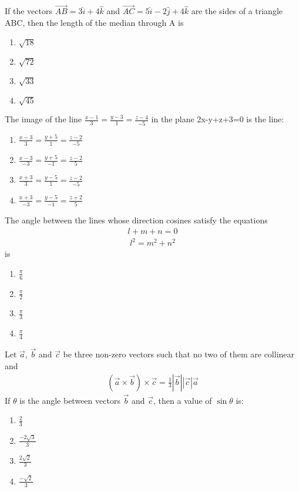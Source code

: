 \item If the vectors $\overrightarrow{AB}=3\hat{i}+4\hat{k}$ and $\overrightarrow{AC}=5\hat{i}-2\hat{j}+4\hat{k}$ are the sides of a triangle ABC, then the length of the median through A is
\begin{enumerate}
\item $\sqrt{18}$
\item $\sqrt{72}$
\item $\sqrt{33}$
\item $\sqrt{45}$
\end{enumerate}

\item The image of the line $\frac{x-1}{3}=\frac{y-3}{1}=\frac{z-4}{-5}$ in the plane 2x-y+z+3=0 is the line:
\begin{enumerate}
\item $\frac{x-3}{3}=\frac{y+5}{1}=\frac{z-2}{-5}$
\item $\frac{x-3}{-3}=\frac{y+5}{-1}=\frac{z-2}{5}$
\item $\frac{x+3}{3}=\frac{y-5}{1}=\frac{z-2}{-5}$
\item $\frac{x+3}{-3}=\frac{y-5}{-1}=\frac{z+2}{5}$ 
\end{enumerate}

\item The angle between the lines whose direction cosines satisfy the equations
\begin{align*}
l+m+n=0
\end{align*}
\begin{align*}
l^2=m^2+n^2
\end{align*}
is
\begin{enumerate}
\item $\frac{\pi}{6}$
\item $\frac{\pi}{2}$
\item $\frac{\pi}{3}$
\item $\frac{\pi}{4}$
\end{enumerate}

\item Let $\overrightarrow{a}$, $\overrightarrow{b}$ and $\overrightarrow{c}$ be three non-zero vectors such that no two of them are collinear and 
\begin{align*}
(\overrightarrow{a} \times \overrightarrow{b}) \times \overrightarrow{c}=\frac{1}{3}|\overrightarrow{b}||\overrightarrow{c}|\overrightarrow{a}
\end{align*}
If $\theta$ is the angle between vectors $\overrightarrow{b}$ and $\overrightarrow{c}$, then a value of $\sin\theta$ is:
\begin{enumerate}
\item $\frac{2}{3}$
\item $\frac{-2\sqrt{3}}{3}$
\item $\frac{2\sqrt{2}}{3}$
\item $\frac{-\sqrt{2}}{3}$
\end{enumerate}

